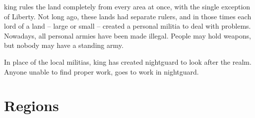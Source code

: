\begin{multicols}{2}
\Gls{king} rules the land completely from every area at once, with the single exception of Liberty.
Not long ago, these lands had separate rulers, and in those times each lord of a land -- large or small -- created a personal militia to deal with problems.
Nowadays, all personal armies have been made illegal.
People may hold weapons, but nobody may have a standing army.

In place of the local militias, \gls{king} has created \gls{nightguard} to look after the realm.
Anyone unable to find proper work, goes to work in \gls{nightguard}.

\end{multicols}

\section{Regions}
\label{encounters}

